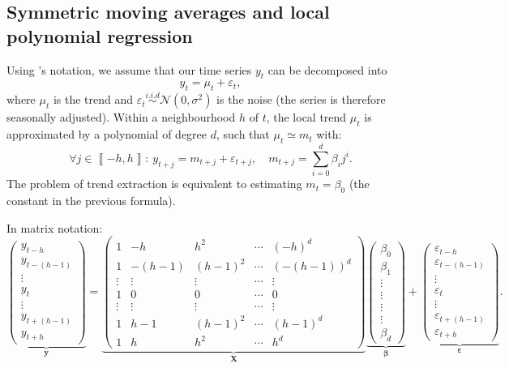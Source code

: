\documentclass[
]{article}
\newcommand\1{\mathds{1}}
\begin{document}
\hypertarget{symmetric-moving-averages-and-local-polynomial-regression}{%
\subsection{Symmetric moving averages and local polynomial
regression}\label{symmetric-moving-averages-and-local-polynomial-regression}}

Using \textcite{proietti2008}'s notation, we assume that our time series
\(y_t\) can be decomposed into \[
y_t=\mu_t+\varepsilon_t,
\] where \(\mu_t\) is the trend and
\(\varepsilon_{t}\overset{i.i.d}{\sim}\mathcal{N}(0,\sigma^{2})\) is the
noise (the series is therefore seasonally adjusted). Within a
neighbourhood \(h\) of \(t\), the local trend \(\mu_t\) is approximated
by a polynomial of degree \(d\), such that \(\mu_t\simeq m_{t}\) with:
\[
\forall j\in\left\llbracket -h,h\right\rrbracket:\:
y_{t+j}=m_{t+j}+\varepsilon_{t+j},\quad m_{t+j}=\sum_{i=0}^{d}\beta_{i}j^{i}.
\] The problem of trend extraction is equivalent to estimating
\(m_t=\beta_0\) (the constant in the previous formula).

In matrix notation: \[
\underbrace{\begin{pmatrix}y_{t-h}\\
y_{t-(h-1)}\\
\vdots\\
y_{t}\\
\vdots\\
y_{t+(h-1)}\\
y_{t+h}
\end{pmatrix}}_{\boldsymbol y}=\underbrace{\begin{pmatrix}1 & -h & h^{2} & \cdots & (-h)^{d}\\
1 & -(h-1) & (h-1)^{2} & \cdots & (-(h-1))^{d}\\
\vdots & \vdots & \vdots & \cdots & \vdots\\
1 & 0 & 0 & \cdots & 0\\
\vdots & \vdots & \vdots & \cdots & \vdots\\
1 & h-1 & (h-1)^{2} & \cdots & (h-1)^{d}\\
1 & h & h^{2} & \cdots & h^{d}
\end{pmatrix}}_{\boldsymbol X}\underbrace{\begin{pmatrix}\beta_{0}\\
\beta_{1}\\
\vdots\\
\vdots\\
\vdots\\
\vdots\\
\beta_{d}
\end{pmatrix}}_{\boldsymbol \beta}+\underbrace{\begin{pmatrix}\varepsilon_{t-h}\\
\varepsilon_{t-(h-1)}\\
\vdots\\
\varepsilon_{t}\\
\vdots\\
\varepsilon_{t+(h-1)}\\
\varepsilon_{t+h}
\end{pmatrix}}_{\boldsymbol \varepsilon}.
\]
\end{document}
